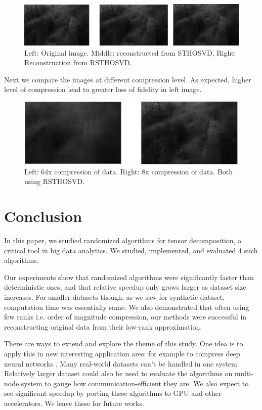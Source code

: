 \documentclass[preprint]{elsarticle}
\begin{document}
\begin{figure}[h!]
    \centering
    \includegraphics[width=\textwidth]{figs/osr.png}
    \caption{Left: Original image. Middle: reconstructed from STHOSVD, Right: Reconstruction from RSTHOSVD.}
    \label{fig:my_label}
\end{figure}

Next we compare the images at different compression level. As expected, higher level of compression lead to greater loss of fidelity in left image.


\begin{figure}[h]
    \centering
    \includegraphics[width=\textwidth]{figs/648.png}
    \caption{Left: 64x compression of data. Right: 8x compression of data. Both using RSTHOSVD.}
    \label{fig:my_label}
\end{figure}


\section{Conclusion}
In this paper, we studied randomized algorithms for tensor decomposition, a critical tool in big data analytics. We studied, implemented, and evaluated 4 such algorithms. 

Our experiments show that randomized algorithms were significantly faster than deterministic ones, and that relative speedup only grows larger as dataset size increases. For smaller datasets though, as we saw for synthetic dataset, computation time was essentially same. We also demonstrated that often using few ranks i.e. order of magnitude compression, our methods were successful in reconstructing original data from their low-rank approximation.

There are ways to extend and explore the theme of this study. One idea is to apply this in new interesting application ares: for example to compress deep neural networks \cite{bacciu2020tensor}. Many real-world datasets can't be handled in one system. Relatively larger dataset could also be used to evaluate the algorithms on multi-node system to gauge how communication-efficient they are. We also expect to see significant speedup by  porting these algorithms to GPU and other accelerators. We leave these for future works.



\end{document}
